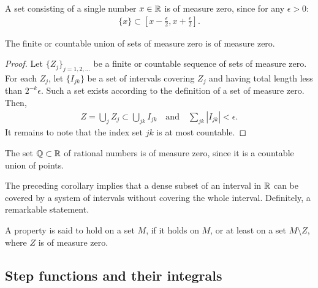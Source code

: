 \begin{example}
  A set consisting of a single number $x\in\mathbb R$ is of measure zero,
  since for any $\epsilon>0$:
  \begin{gather*}
    \{x\} \subset \left[x-\tfrac\epsilon2,x+\tfrac\epsilon2\right].  
  \end{gather*}
\end{example}

\begin{lemma}
  The finite or countable union of sets of measure zero is of measure
  zero.
\end{lemma}

\begin{proof}
  Let $\{Z_j\}_{j=1,2,\dots}$ be a finite or countable sequence of
  sets of measure zero. For each $Z_j$, let $\{I_{jk}\}$ be a set of
  intervals covering $Z_j$ and having total length less than
  $2^{-k}\epsilon$. Such a set exists according to the definition of
  a set of measure zero. Then,
  \begin{gather*}
    Z = \bigcup_j Z_j \subset \bigcup_{jk} I_{jk}
    \quad\text{and}\quad
    \sum_{jk} |I_{jk}| < \epsilon.
  \end{gather*}
  It remains to note that the index set $jk$ is at most countable.
\end{proof}

\begin{corollary}
  The set $\mathbb Q\subset \mathbb R$ of rational numbers is of measure zero, since
  it is a countable union of points.
\end{corollary}

\begin{note}
  The preceding corollary implies that a dense subset of an interval
  in $\mathbb R$ can be covered by a system of intervals without covering the
  whole interval. Definitely, a remarkable statement.
\end{note}

\begin{definition}
  \label{def:almost-everywhere}
  A property is said to hold  on a set $M$,
  if it holds on $M$, or at least on a set $M\setminus Z$, where $Z$
  is of measure zero.
\end{definition}

\subsection{Step functions and their integrals}

